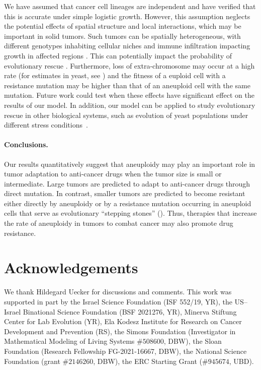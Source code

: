 \documentclass[12pt]{extarticle}
\begin{document}
We have assumed that cancer cell lineages are independent and have verified that this is accurate under simple logistic growth. However, this assumption neglects the potential effects of spatial structure and local interactions, which may be important in solid tumors. Such tumors can be spatially heterogeneous, with different genotypes inhabiting cellular niches and immune infiltration impacting growth in affected regions \citep{varrone2023cellcharter,galon2010immune}. This can potentially impact the probability of evolutionary rescue \citep{martens2011spatial}. 
Furthermore, loss of extra-chromosome may occur at a high rate (for estimates in yeast, see \citet{hose_rate_2024}) and the fitness of a euploid cell with a resistance mutation may be higher than that of an aneuploid cell with the same mutation. Future work could test when these effects have significant effect on the results of our model. %
In addition, our model can be applied to study evolutionary rescue in other biological systems, such as evolution of yeast populations under different stress conditions~\citep{pompei2023fitness,kohanovski2024aneuploidy}. 

\paragraph{Conclusions.}

Our results quantitatively suggest that aneuploidy may play an important role in tumor adaptation to anti-cancer drugs when the tumor size is small or intermediate. Large tumors are predicted to adapt to anti-cancer drugs through direct mutation. In contrast, smaller tumors are predicted to become resistant either directly by aneuploidy or by a resistance mutation occurring in aneuploid cells that serve as evolutionary ``stepping stones'' (). Thus, therapies that increase the rate of aneuploidy in tumors to combat cancer may also promote drug resistance.

{\small
\section*{Acknowledgements}
We thank Hildegard Uecker for discussions and comments. 
This work was supported in part by
the Israel Science Foundation (ISF 552/19, YR),
the US–Israel Binational Science Foundation (BSF 2021276, YR), 
Minerva Stiftung Center for Lab Evolution (YR), 
Ela Kodesz Institute for Research on Cancer Development and Prevention (RS),
the Simons Foundation (Investigator in Mathematical Modeling of Living Systems $\#508600$, DBW),
the Sloan Foundation (Research Fellowship FG-2021-16667, DBW),
the National Science Foundation (grant $\#2146260$, DBW), the ERC Starting Grant ($\#945674$, UBD).
}
\end{document}
